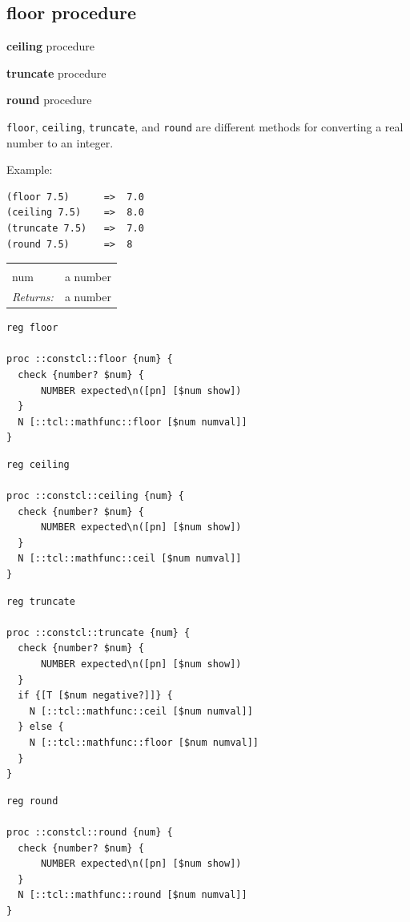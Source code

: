 \documentclass[twoside,9pt]{report}
\begin{document}
\subsection{floor procedure}
\label{floor-procedure}

\noindent \textbf{ceiling} procedure


\noindent \textbf{truncate} procedure


\noindent \textbf{round} procedure



\texttt{floor}, \texttt{ceiling}, \texttt{truncate}, and \texttt{round} are different methods for converting a real number to an integer.



Example:

\begin{verbatim}
(floor 7.5)      =>  7.0
(ceiling 7.5)    =>  8.0
(truncate 7.5)   =>  7.0
(round 7.5)      =>  8
\end{verbatim}
\noindent\begin{tabular}{ |p{1.9cm} p{8cm}| }
\hline
\rowcolor[HTML]{CCCCCC} \multicolumn{2}{|l|}{\bf floor, ceiling, truncate, round (public)} \\
num & a number \\
\textit{Returns:} & a number \\
\hline
\end{tabular}
\begin{lstlisting}
reg floor

proc ::constcl::floor {num} {
  check {number? $num} {
      NUMBER expected\n([pn] [$num show])
  }
  N [::tcl::mathfunc::floor [$num numval]]
}
\end{lstlisting}
\begin{lstlisting}
reg ceiling

proc ::constcl::ceiling {num} {
  check {number? $num} {
      NUMBER expected\n([pn] [$num show])
  }
  N [::tcl::mathfunc::ceil [$num numval]]
}
\end{lstlisting}
\begin{lstlisting}
reg truncate

proc ::constcl::truncate {num} {
  check {number? $num} {
      NUMBER expected\n([pn] [$num show])
  }
  if {[T [$num negative?]]} {
    N [::tcl::mathfunc::ceil [$num numval]]
  } else {
    N [::tcl::mathfunc::floor [$num numval]]
  }
}
\end{lstlisting}
\begin{lstlisting}
reg round

proc ::constcl::round {num} {
  check {number? $num} {
      NUMBER expected\n([pn] [$num show])
  }
  N [::tcl::mathfunc::round [$num numval]]
}
\end{lstlisting}
\end{document}
